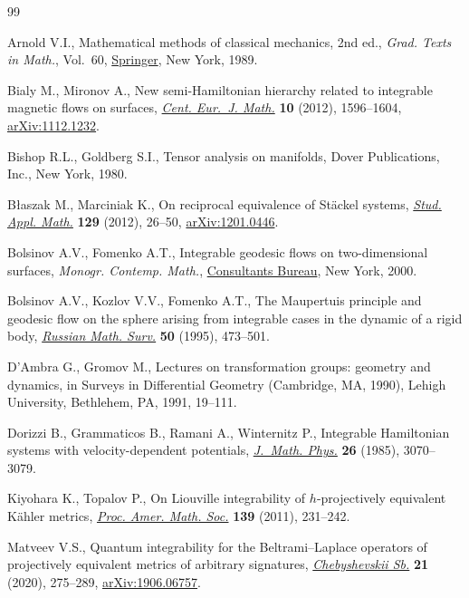 \documentclass[10pt,a4paper]{amsart}
\numberwithin{equation}{section}
\begin{document}
\begin{thebibliography}{99}
\footnotesize\itemsep=0pt

Arnold V.I., Mathematical methods of classical mechanics, 2nd ed., \textit{Grad. Texts
  in Math.}, Vol.~60, \href{https://doi.org/10.1007/978-1-4757-2063-1}{Springer}, New York, 1989.

Bialy M., Mironov A., New semi-{H}amiltonian hierarchy related to integrable
  magnetic flows on surfaces, \href{https://doi.org/10.2478/s11533-012-0045-3}{\textit{Cent. Eur.~J. Math.}} \textbf{10} (2012),
  1596--1604, \href{https://arxiv.org/abs/1112.1232}{arXiv:1112.1232}.

Bishop R.L., Goldberg S.I., Tensor analysis on manifolds, Dover Publications,
  Inc., New York, 1980.

B{\l}aszak M., Marciniak K., On reciprocal equivalence of {S}t\"ackel systems,
  \href{https://doi.org/10.1111/j.1467-9590.2011.00544.x}{\textit{Stud. Appl. Math.}} \textbf{129} (2012), 26--50, \href{https://arxiv.org/abs/1201.0446}{arXiv:1201.0446}.

Bolsinov A.V., Fomenko A.T., Integrable geodesic flows on two-dimensional
  surfaces, \textit{Monogr. Contemp. Math.}, \href{https://doi.org/10.1007/978-1-4615-4307-7}{Consultants Bureau}, New York, 2000.

Bolsinov A.V., Kozlov V.V., Fomenko A.T., The Maupertuis principle and geodesic
  flow on the sphere arising from integrable cases in the dynamic of a rigid
  body, \href{https://doi.org/10.1070/RM1995v050n03ABEH002100}{\textit{Russian Math. Surv.}} \textbf{50} (1995), 473--501.

D'Ambra G., Gromov M., Lectures on transformation groups: geometry and
  dynamics, in Surveys in Differential Geometry ({C}ambridge, {MA}, 1990),
  Lehigh University, Bethlehem, PA, 1991, 19--111.

Dorizzi B., Grammaticos B., Ramani A., Winternitz P., Integrable {H}amiltonian
  systems with velocity-dependent potentials, \href{https://doi.org/10.1063/1.526685}{\textit{J.~Math. Phys.}}
  \textbf{26} (1985), 3070--3079.

Kiyohara K., Topalov P., On {L}iouville integrability of {$h$}-projectively
  equivalent {K}\"ahler metrics, \href{https://doi.org/10.1090/S0002-9939-2010-10576-2}{\textit{Proc. Amer. Math. Soc.}} \textbf{139}
  (2011), 231--242.

Matveev V.S., Quantum integrability for the {B}eltrami--{L}aplace operators of
  projectively equivalent metrics of arbitrary signatures,
  \href{https://doi.org/10.22405/2226-8383-2020-21-2-275-289}{\textit{Chebyshevskii Sb.}} \textbf{21} (2020), 275--289, \href{https://arxiv.org/abs/1906.06757}{arXiv:1906.06757}.


\end{thebibliography}
\end{document}
